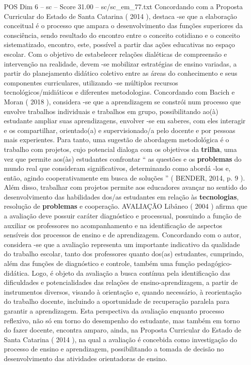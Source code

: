 \begin{textsample}{POS Dim 6 – sc – Score 31.00 – sc/sc\_em\_77.txt}
Concordando com a Proposta Curricular do Estado de Santa Catarina ( 2014 ), destaca -se que a elaboração conceitual é o processo que ampara o desenvolvimento das funções superiores da consciência, sendo resultado do encontro entre o conceito cotidiano e o conceito sistematizado, encontro, este, possível a partir das ações educativas no espaço escolar.
Com o objetivo de estabelecer relações dialéticas de compreensão e intervenção na realidade, devem -se mobilizar estratégias de ensino variadas, a partir do planejamento didático coletivo entre as áreas do conhecimento e seus componentes curriculares, utilizando -se múltiplos recursos tecnológicos/midiáticos e diferentes metodologias.
Concordando com Bacich e Moran ( 2018 ), considera -se que a aprendizagem se constrói num processo que envolve trabalhos individuais e trabalhos em grupo, possibilitando ao(à) estudante ampliar suas aprendizagens, envolver -se em saberes, com eles interagir e os compartilhar, orientado(a) e supervisionado/a pelo docente e por pessoas mais experientes.
Para tanto, uma sugestão de abordagem metodológica é o trabalho com projetos, cujo potencial dialoga com os objetivos da \textbf{trilha}, uma vez que permite aos(às) estudantes confrontar “ as questões e os \textbf{problemas} do mundo real que consideram significativos, determinando como abordá -los e, então, agindo cooperativamente em busca de soluções ” ( BENDER, 2014, p. 9 ).
Além disso, trabalhar com projetos permite aos educadores avançar no sentido do desenvolvimento das habilidades dos/as estudantes em relação às \textbf{tecnologias}, resolução de \textbf{problemas} e cooperação.
AVALIAÇÃO Libâneo ( 2004 ) afirma que a avaliação deve possuir caráter diagnóstico e processual, possuindo a função de auxiliar os professores no acompanhamento e na identificação de aspectos sensíveis dos processos de ensino e de aprendizagem.
Concordando com o autor, considera -se que a avaliação representa um importante indicativo da qualidade do trabalho escolar, tanto dos professores quanto dos(as) estudantes, cumprindo, além das funções de diagnóstico e controle, também uma função pedagógico-didática.
Logo, é objeto da avaliação a busca contínua pela identificação das dificuldades e potencialidades das relações de ensino-aprendizagem, a partir de instrumentos diversos, visando à orientação e, quando necessário, à reorientação do trabalho docente, incluindo a oportunidade de recuperação paralela para garantir a aprendizagem.
Esta perspectiva da avaliação enquanto processo reflexivo, não só em torno do desempenho do estudante, mas também em torno do fazer docente, encontra amparo, ainda, na Proposta Curricular do Estado de Santa Catarina ( 2014 ), na qual a avaliação é concebida como investigação do processo de ensino e aprendizagem, possibilitando a tomada de decisão no desenvolvimento das atividades orientadoras de ensino.

\end{textsample}

